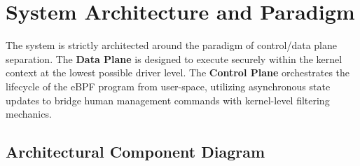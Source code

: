 \documentclass[11pt,a4paper]{article}
\begin{document}
\section{System Architecture and Paradigm}

The system is strictly architected around the paradigm of control/data plane separation.
The \textbf{Data Plane} is designed to execute securely within the kernel context at the lowest possible driver level.
The \textbf{Control Plane} orchestrates the lifecycle of the eBPF program from user-space, utilizing asynchronous state updates to bridge human management commands with kernel-level filtering mechanics.

\subsection{Architectural Component Diagram}
\end{document}
